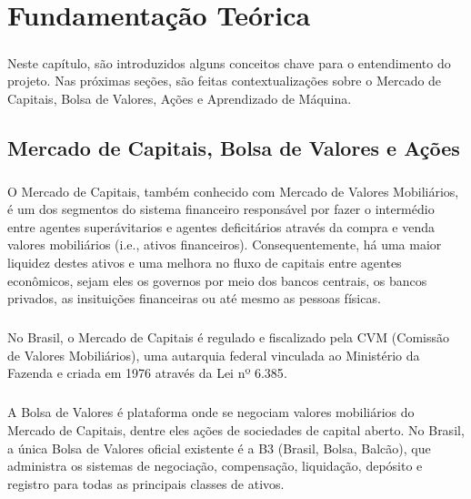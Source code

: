 \chapter{Fundamentação Teórica}
\label{cap2}

\paragraph{} Neste capítulo, são introduzidos alguns conceitos chave para o entendimento do projeto. Nas próximas seções, são feitas contextualizações sobre o Mercado de Capitais, Bolsa de Valores, Ações e Aprendizado de Máquina.

\section{Mercado de Capitais, Bolsa de Valores e Ações}

\paragraph{} O Mercado de Capitais, também conhecido com Mercado de Valores Mobiliários, é um dos segmentos do sistema financeiro responsável por fazer o intermédio entre agentes superávitarios e agentes deficitários através da compra e venda valores mobiliários (i.e., ativos financeiros)\cite{mercado_de_capitais}. Consequentemente, há uma maior liquidez destes ativos e uma melhora no fluxo de capitais entre agentes econômicos, sejam eles os governos por meio dos bancos centrais, os bancos privados, as insituições financeiras ou até mesmo as pessoas físicas.

\paragraph{} No Brasil, o Mercado de Capitais é regulado e fiscalizado pela CVM (Comissão de Valores Mobiliários), uma autarquia federal vinculada ao Ministério da Fazenda e criada em 1976 através da Lei nº 6.385\cite{lei_6385}.

\paragraph{} A Bolsa de Valores é plataforma onde se negociam valores mobiliários do Mercado de Capitais, dentre eles ações de sociedades de capital aberto. No Brasil, a única Bolsa de Valores oficial existente é a B3 (Brasil, Bolsa, Balcão)\cite{b3}, que administra os sistemas de negociação, compensação, liquidação, depósito e registro para todas as principais classes de ativos.

